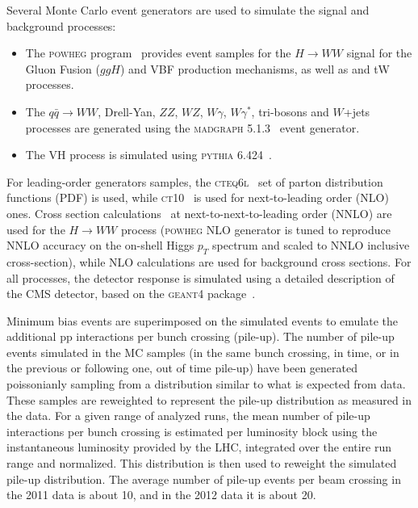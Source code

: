 Several Monte Carlo event generators are used to simulate the signal and background processes:
\begin{itemize}
\item The \textsc{powheg} program~\cite{powheg} provides event samples for the $H \rightarrow WW$ signal
for the Gluon Fusion ($ggH$) and VBF production mechanisms, as well as \ttbar and tW processes.
\item The $q\bar{q} \to WW$, Drell-Yan, $ZZ$, $WZ$, $W\gamma$, $W\gamma^*$, tri-bosons and $W$+jets processes are generated using
the \textsc{madgraph 5.1.3}~\cite{madgraph} event generator.
\item The VH process is simulated using \textsc{pythia 6.424}~\cite{pythia}.
\end{itemize}
For leading-order generators samples, the \textsc{cteq6l}~\cite{cteq66} set of parton distribution functions
(PDF) is used, while \textsc{ct10}~\cite{ct10} is used for next-to-leading order (NLO) ones.
Cross section calculations~\cite{LHCHiggsCrossSectionWorkingGroup:2011ti} at next-to-next-to-leading order (NNLO) are used for the $H \rightarrow WW$ process (\textsc{powheg} NLO generator is tuned to reproduce NNLO accuracy on the on-shell Higgs $p_T$ spectrum and scaled to NNLO inclusive cross-section), while NLO calculations are used for background cross sections.
For all processes, the detector response is simulated using a detailed description of the CMS detector, based on the \textsc{geant4} package~\cite{Agostinelli:2002hh}.

Minimum bias events are superimposed on the simulated events to emulate the additional 
pp interactions per bunch crossing (pile-up). The number of pile-up events simulated in the MC samples
(in the same bunch crossing, in time, or in the previous or following one, out of time pile-up)
have been generated poissonianly sampling from a distribution similar to what
is expected from data. These samples are reweighted to represent the pile-up
distribution as measured in the data. For a given range of analyzed runs, the mean number of pile-up
interactions per bunch crossing is estimated per luminosity block using the instantaneous luminosity provided by
the LHC, integrated over the entire run range and normalized. This distribution
is then used to reweight the simulated pile-up distribution. 
The average number of pile-up events per beam crossing in the 2011 data is about 10, and in the 2012 data it is about 20.

